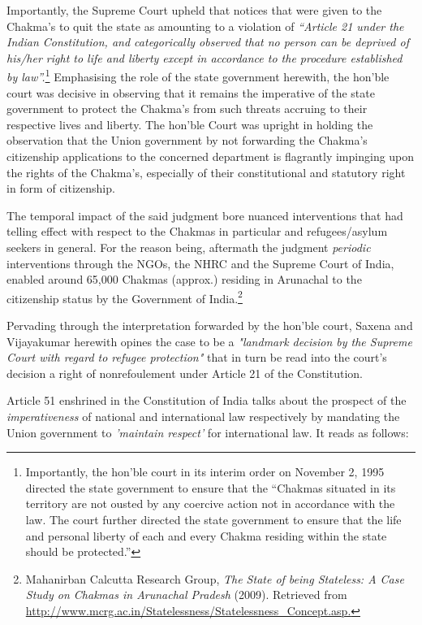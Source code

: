 \begin{multicols}{2}
\noi
Importantly, the Supreme Court upheld that notices that were given to the Chakma’s to quit
the state as amounting to a violation of \textit{“Article 21 under the Indian Constitution, and
categorically observed that no person can be deprived of his/her right to life and liberty
except in accordance to the procedure established by law”.}\footnote{Importantly, the hon’ble court in its interim order on November 2, 1995 directed the state government to ensure that the “Chakmas situated in its territory are not ousted by any coercive action not in accordance with the law. The court further directed the state government to ensure that the life and personal liberty of each and every Chakma residing within the state should be protected.”} Emphasising the role of the state government herewith, the hon’ble court was decisive in observing that it remains the
imperative of the state government to protect the Chakma’s from such threats accruing to
their respective lives and liberty. The hon’ble Court was upright in holding the observation
that the Union government by not forwarding the Chakma’s citizenship applications to the
concerned department is flagrantly impinging upon the rights of the Chakma’s, especially of
their constitutional and statutory right in form of citizenship.

\noi
The temporal impact of the said judgment bore nuanced interventions that had telling effect
with respect to the Chakmas in particular and refugees/asylum seekers in general. For the
reason being, aftermath the judgment \textit{periodic} interventions through the NGOs, the NHRC
and the Supreme Court of India, enabled around 65,000 Chakmas (approx.) residing in
Arunachal to the citizenship status by the Government of India.\footnote{Mahanirban Calcutta Research Group, \textit{The State of being Stateless: A Case Study on Chakmas in Arunachal Pradesh} (2009). Retrieved from \url{http://www.mcrg.ac.in/Statelessness/Statelessness_Concept.asp.}}

\noi
Pervading through the interpretation forwarded by the hon’ble court, Saxena and
Vijayakumar herewith opines the case to be a  \textit{"landmark decision by the Supreme Court with
regard to refugee protection"} that in turn be read into the court's decision a right of nonrefoulement under Article 21 of the Constitution.


\noi
Article 51 enshrined in the Constitution of India talks about the prospect of the
\textit{imperativeness} of national and international law respectively by mandating the Union
government to \textit{'maintain respect'} for international law. It reads as follows:


\end{multicols}
